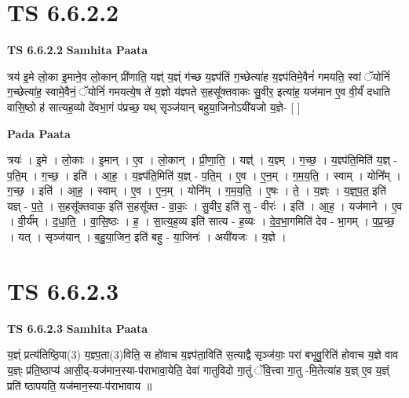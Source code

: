 \documentclass[17pt]{extarticle}
\begin{document}
\section*{ TS 6.6.2.2 }

\textbf{TS 6.6.2.2 } \newline
\textbf{Samhita Paata} \newline

त्रय॑ इ॒मे लो॒का इ॒माने॒व लो॒कान् प्री॑णाति॒ यज्ञ्॑ य॒ज्ञ्ं ग॑च्छ य॒ज्ञ्प॑तिं ग॒च्छेत्या॑ह य॒ज्ञ्प॑तिमे॒वैनं॑ गमयति॒ स्वां ॅयोनिं॑ ग॒च्छेत्या॑ह॒ स्वामे॒वैनं॒ ॅयोनिं॑ गमयत्ये॒ष ते॑ य॒ज्ञो य॑ज्ञ्पते स॒हसू᳚क्तवाकः सु॒वीर॒ इत्या॑ह॒ यज॑मान ए॒व वी॒र्यं॑ दधाति वासि॒ष्ठो ह॑ सात्यह॒व्यो दे॑वभा॒गं प॑प्रच्छ॒ यथ् सृञ्ज॑यान् बहुया॒जिनोऽयी॑यजो य॒ज्ञे- [  ] \newline

\textbf{Pada Paata} \newline

त्रयः॑ । इ॒मे । लो॒काः । इ॒मान् । ए॒व । लो॒कान् । प्री॒णा॒ति॒ । यज्ञ्॑ । य॒ज्ञ्म् । ग॒च्छ॒ । य॒ज्ञ्प॑ति॒मिति॑ य॒ज्ञ् - प॒ति॒म् । ग॒च्छ॒ । इति॑ । आ॒ह॒ । य॒ज्ञ्प॑ति॒मिति॑ य॒ज्ञ् - प॒ति॒म् । ए॒व । ए॒न॒म् । ग॒म॒य॒ति॒ । स्वाम् । योनि᳚म् । ग॒च्छ॒ । इति॑ । आ॒ह॒ । स्वाम् । ए॒व । ए॒न॒म् । योनि᳚म् । ग॒म॒य॒ति॒ । ए॒षः । ते॒ । य॒ज्ञ्ः । य॒ज्ञ्॒प॒त॒ इति॑ यज्ञ् - प॒ते॒ । स॒हसू᳚क्तवाक॒ इति॑ स॒हसू᳚क्त - वा॒कः॒ । सु॒वीर॒ इति॑ सु - वीरः॑ । इति॑ । आ॒ह॒ । यज॑माने । ए॒व । वी॒र्य᳚म् । द॒धा॒ति॒ । वा॒सि॒ष्ठः । ह॒ । सा॒त्य॒ह॒व्य इति॑ सात्य - ह॒व्यः । दे॒व॒भा॒गमिति॑ देव - भा॒गम् । प॒प्र॒च्छ॒ । यत् । सृञ्ज॑यान् । ब॒हु॒या॒जिन॒ इति॑ बहु - या॒जिनः॑ । अयी॑यजः । य॒ज्ञे ।  \newline




\section*{ TS 6.6.2.3 }

\textbf{TS 6.6.2.3 } \newline
\textbf{Samhita Paata} \newline

य॒ज्ञ्ं प्रत्य॑तिष्ठि॒पा(3) य॒ज्ञ्प॒ता(3)विति॒ स हो॑वाच य॒ज्ञ्प॑ता॒विति॑ स॒त्याद्वै सृञ्ज॑याः॒ परा॑ बभूवु॒रिति॑ होवाच य॒ज्ञे वाव य॒ज्ञ्ः प्र॑ति॒ष्ठाप्य॑ आसी॒द्-यज॑मान॒स्या-प॑राभावा॒येति॒ देवा॑ गातुविदो गा॒तुं ॅवि॒त्त्वा गा॒तु -मि॒तेत्या॑ह य॒ज्ञ् ए॒व य॒ज्ञ्ं प्रति॑ ष्ठापयति॒ यज॑मान॒स्या-प॑राभावाय ॥ \newline
\end{document}
